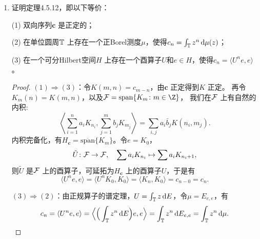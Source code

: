 \begin{enumerate}
\begin{proof}
建立Stone表示：因$ \tau_{t} = \F^{-1}U_{t}\F $，我们记
\[ P(\Delta) = \F^{-1}E(\Delta)\F =\F^{-1}M_{\chi_{\Delta}}\F ,\]
则对于任意的$ g,h\in L^{2} $，有
\begin{align*}
    P_{g,h}(\Delta) &= \langle P(\Delta)g, h \rangle = \langle \F^{-1}M_{\chi_{\Delta}}\F g, h \rangle \\
    &= \langle M_{\chi_{\Delta}}\F g, \F h \rangle = E_{\hat{g},\hat{h}}(\Delta). 
\end{align*}
于是有$ \mathrm{d}P_{g,h} = \mathrm{d}E_{\hat{g},\hat{h}} $，我们得到
\begin{align*}
    \langle \tau_{t}g, h \rangle &= \langle \F^{-1}U_{t}\F g,h \rangle = \langle U_{t}\F g, \F h \rangle \\
    &= \langle U_{t}\hat{g}, \hat{h} \rangle = \int_{\R}{\mathrm{e}^{-\mathrm{i}st}\,\mathrm{d}E_{\hat{g},\hat{h}}(s)} \\
    &= \int_{\R}{\mathrm{e}^{-\mathrm{i}st}\,\mathrm{d}P_{g,h}(s)}.
\end{align*}
由此$ \tau_{t} = \int_{\R}{\mathrm{e}^{-\mathrm{i}st}\,\mathrm{d}P} $。
\end{proof}

\item[2]
证明定理4.5.12，即以下等价：

(1) 双向序列$ \mathbf{c} $ 是正定的；

(2) 在单位圆周$ \mathbb{T} $ 上存在一个正Borel测度$ \mu $，使得$ c_{n}=\int_{\mathbb{T}}{z^{n}\,\mathrm{d}\mu(z)} $；

(3) 在一个可分Hilbert空间$ H $ 上存在一个酉算子$ U $和$ e\in H $，使得$ c_{n}=\langle U^{n}e,e \rangle  $。

\begin{proof}
    $ (1)\Rightarrow(3) $：令$ K(m,n)=c_{m-n} $，由$ \mathbf{c} $ 正定得到$ K $ 正定。
    再令$ K_{m}(n) = K(m,n) $，以及$ \F = \mathrm{span}\{K_{m}\colon m\in\Z\} $，
    我们在$ \mathcal{F} $ 上有自然的内积:
    $$
     \left\langle \sum_{i=1}^{n}a_{i}K_{n_i}, \sum_{j=1}^{m}b_{j}K_{m_j} \right\rangle 
     = \sum_{i,j}a_{i}\bar{b}_{j}K(n_i,m_j).
    $$ 
    内积完备化，有$ H_{\mathbf{c}} = \overline{\mathrm{span}}\{K_{m}\} $。令$ e=K_{0} $，
    \[\tilde{U}\colon \mathcal{F} \to \mathcal{F}, \quad \sum{a_{i}K_{n_{i}}}\mapsto \sum{a_{i}K_{n_{i}+1}},\]
    则$ \tilde{U} $ 是$ \mathcal{F} $ 上的酉算子，可延拓为$ H_{\mathbf{c}} $ 上的酉算子$ U $，于是有
    $$
     \langle U^{n}e,e \rangle = \langle U^{n}K_{0},K_{0} \rangle = \langle K_{n}, K_{0} \rangle = c_{n-0} = c_{n}.
    $$ 

    $ (3)\Rightarrow(2) $：由正规算子的谱定理，$ U = \int_{\mathbb{T}}z\,\mathrm{d}E $，令$ \mu=E_{e,e} $，有
    $$
      c_{n}=\langle U^{n}e,e \rangle = \Big\langle \Big(\int_{\mathbb{T}}{z^{n}\,\mathrm{d}E}\Big)e,e \Big\rangle 
      = \int_{\mathbb{T}}{z^n\,\mathrm{d}E_{e,e}} = \int_{\mathbb{T}}{z^n\,\mathrm{d}\mu}.
    $$ 


\end{proof}
\end{enumerate}
